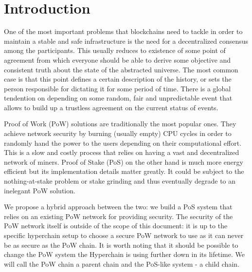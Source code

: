 \section{Introduction}

One of the most important problems that blockchains need to tackle in order to
maintain a stable and safe infrastructure is the need for a decentralized
consensus among the participants. This usually reduces to existence of some
point of agreement from which everyone should be able to derive some objective
and consistent truth about the state of the abstracted universe. The most common
case is that this point defines a certain description of the history, or sets
the person responsible for dictating it for some period of time. There is a
global tendention on depending on some random, fair and unpredictable event that
allows to build up a trustless agreement on the current status of events.

Proof of Work (PoW) solutions are traditionally the most popular ones.
They achieve network security by burning (usually empty) CPU cycles in order to
randomly hand the power to the users depending on their computational effort.
This is a slow and costly process that relies on having
a vast and decentralized network of miners. Proof of Stake (PoS) on the other
hand is much more energy efficient but its implementation details matter
greatly. It could be subject to the nothing-at-stake problem or stake grinding and
thus eventually degrade to an inelegant PoW solution.

We propose a hybrid approach between the two: we build a PoS system that
relies on an existing PoW network for providing security. The security of the
PoW network itself is outside of the scope of this document: it is up to
the specific hyperchain setup to choose a secure PoW network to use as it
can never be as secure as the PoW chain. It is worth noting that it should
be possible to change the PoW system the Hyperchain is using further down
in its lifetime. We will call the PoW chain a parent chain and the PoS-like
system - a child chain.

